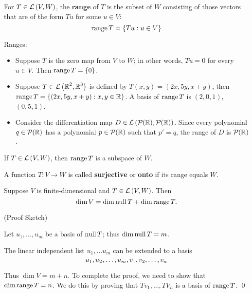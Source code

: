 \begin{definition} [Range]
   For $T \in \mathcal{L} \left( V, W \right)$, the \textbf{range} of $T$ is the subset
   of $W$ consisting of those vectors that are of the form $Tu$ for some $u \in V$:
   \[ \operatorname{range} T = \{ Tu : u \in V \} \]
\end{definition}

\begin{example} Ranges:
   \begin{itemize}
      \item Suppose $T$ is the zero map from $V$ to $W$; in other words,
      $Tu = 0$ for every $u \in V$. Then $\operatorname{range} T = \{ 0 \}$.
      \item Suppose $T \in \mathcal{L} \left( \operatorname{\mathbb{R}}^2, \operatorname{\mathbb{R}}^3 \right)$ is defined by $T(x,y) = (2x, 5y, x+y)$,
      then $\operatorname{range} T = \{ (2x, 5y, x+y) : x, y \in \operatorname{\mathbb{R}} \}$. A basis of $\operatorname{range}{T}$ is $(2, 0, 1)$, $(0, 5, 1)$.
      \item Consider the differentiation map $D \in \Lin{\Polys{\R}{\empty},\Polys{\R}{\empty}}$. Since every polynomial $q \in \Polys{\R}{\empty}$
      has a polynomial $p \in \Polys{\R}{\empty}$ such that $p' = q$, the range of $D$ is $\Polys{\R}{\empty}$.
   \end{itemize}
\end{example}

\begin{theorem} 
   If $T \in \mathcal{L} \left( V, W \right)$, then $\operatorname{range} T$ is a subspace of $W$.
\end{theorem}

\begin{definition} [Surjective]
   A function $T : V \to W$ is called \textbf{surjective} or \textbf{onto}
   if its range equals $W$.
\end{definition}

\begin{theorem} 
   Suppose $V$ is finite-dimensional and $T \in \mathcal{L} \left( V, W \right)$. Then
   \[ \dim V = \dim \operatorname{null} T + \dim \operatorname{range} T. \]
   \begin{proof*}
      (Proof Sketch)

      Let $u_1, \dots, u_m$ be a basis of $\operatorname{null} T$; thus $\dim \operatorname{null} T = m$.

      The linear independent list $u_1, \dots u_m$ can be extended to a basis
      \[ u_1, u_2, \ldots, u_{m}, v_1, v_2, \ldots, v_n \]

      Thus $\dim V = m + n$.
      To complete the proof, we need to show that $\dim \operatorname{range} T = n$. We do this by proving that $Tv_1, \dots, TV_n$
      is a basis of $\operatorname{range} T$. \qed
   \end{proof*}
\end{theorem}


